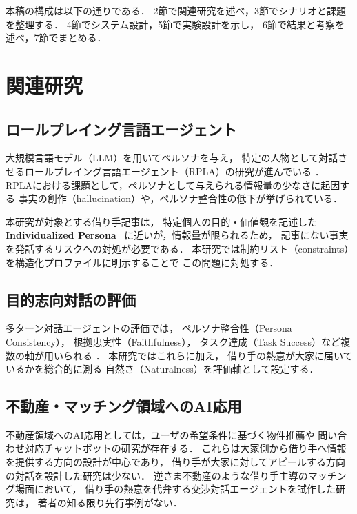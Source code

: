 \documentclass{FITpaper}
\begin{document}
本稿の構成は以下の通りである．
2節で関連研究を述べ，3節でシナリオと課題を整理する．
4節でシステム設計，5節で実験設計を示し，
6節で結果と考察を述べ，7節でまとめる．

\section{関連研究}

\subsection{ロールプレイング言語エージェント}

大規模言語モデル（LLM）を用いてペルソナを与え，
特定の人物として対話させるロールプレイング言語エージェント（RPLA）の研究が進んでいる
\cite{chen2024rpla}．
RPLAにおける課題として，ペルソナとして与えられる情報量の少なさに起因する
事実の創作（hallucination）や，ペルソナ整合性の低下が挙げられている．

本研究が対象とする借り手記事は，
特定個人の目的・価値観を記述した
\textbf{Individualized Persona}~\cite{tseng2024twotales}
に近いが，情報量が限られるため，
記事にない事実を発話するリスクへの対処が必要である．
本研究では制約リスト（constraints）を構造化プロファイルに明示することで
この問題に対処する．

\subsection{目的志向対話の評価}

多ターン対話エージェントの評価では，
ペルソナ整合性（Persona Consistency），
根拠忠実性（Faithfulness），
タスク達成（Task Success）など複数の軸が用いられる
\cite{chen2024rpla}．
本研究ではこれらに加え，
借り手の熱意が大家に届いているかを総合的に測る
自然さ（Naturalness）を評価軸として設定する．

\subsection{不動産・マッチング領域へのAI応用}

不動産領域へのAI応用としては，ユーザの希望条件に基づく物件推薦や
問い合わせ対応チャットボットの研究が存在する．
これらは大家側から借り手へ情報を提供する方向の設計が中心であり，
借り手が大家に対してアピールする方向の対話を設計した研究は少ない．
逆さま不動産のような借り手主導のマッチング場面において，
借り手の熱意を代弁する交渉対話エージェントを試作した研究は，
著者の知る限り先行事例がない．
\end{document}
